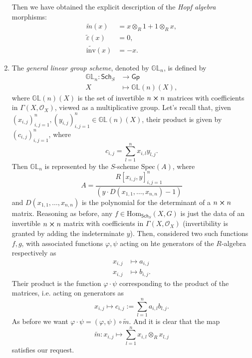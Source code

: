 \documentclass[../Main]{subfiles}
\begin{document}
\begin{ex}
\begin{enumerate}
			Then we have obtained the explicit description of the {\em Hopf algebra}
			morphisms:
			\begin{align}
				\widetilde{m}(x) &= x \otimes_R 1 + 1 \otimes_R x,\\
				\widetilde{\varepsilon}(x) &= 0, \nonumber\\
				\widetilde{\mathrm{inv}}(x) &= -x \nonumber
			.\end{align} 

		\item The {\em general linear group scheme}, denoted by $\mathbb{GL}_n$,
			is defined by
			\begin{align}
				\mathbb{GL}_n\colon \mathsf{Sch}_{ S } &\longrightarrow \mathsf{Gp} \\
				X &\longmapsto \mathbb{GL}(n)(X) \nonumber
			,\end{align} 
			where $\mathbb{GL}(n)(X)$ is the set of invertible $n \cross n$
			matrices with coefficients in $\Gamma \left( X , \mathcal{O}_{ X } \right)$,
			viewed as a multiplicative group.
			Let's recall that, given $\left( x_{i,j} \right)_{i,j = 1}^n, 
			\left( y_{i,j} \right)_{i,j = 1}^n \in \mathbb{GL}(n)(X)$,
			their product is given by $\left( c_{i,j} \right)_{i,j = 1}^n$,
			where
			\begin{equation}
			c_{i,j} = \sum_{l=1}^{n} x_{i,l} y_{l,j}
			.\end{equation} 
			Then $\mathbb{GL}_n$ is represented by the $S$-scheme
			$\mathrm{Spec}(A)$, where
			\begin{equation}
				A = \frac{R[x_{i,j},y]_{i,j = 1}^n}{(y \cdot D(x_{1,1}, \ldots, x_{n,n})-1)}
			\end{equation} 
			and $D(x_{1,1}, \ldots, x_{n,n})$ is the polynomial for the determinant
			of a $n \cross n$ matrix.
			Reasoning as before, any $f \in \mathrm{Hom}_{\mathsf{Sch}_S}
			\left( X, G \right)$ is just the data of an invertible $n \cross n$ matrix
			with coefficients in $\Gamma \left( X , \mathcal{O}_{ X } \right)$
			(invertibility is granted by adding the indeterminate $y$).
			Then, considered two such functions $f,g$, with associated functions
			$\varphi, \psi$ acting on hte generators of the $R$-algebra
			respectively as
			\begin{align}
				x_{i,j} &\longmapsto a_{i,j}\\
				x_{i,j} &\longmapsto b_{i,j}\nonumber
			.\end{align} 
			Their product is the function $\varphi \cdot \psi$
			corresponding to the product of the matrices, i.e. acting on generators as
			\begin{equation}
				x_{i,j} \longmapsto c_{i,j} := 
				\sum_{l=1}^{n} a_{i,l} b_{l,j}
			.\end{equation} 
			As before we want $\varphi \cdot \psi = (\varphi, \psi) \circ \widetilde{m}$.
			And it is clear that the map
			\begin{equation}
				\widetilde{m}\colon x_{i,j} \longmapsto 
				\sum_{l=1}^{n} x_{i,l} \otimes_R x_{l,j}
			\end{equation} 
			satisfies our request.
	\end{enumerate}
\end{ex}
\end{document}
